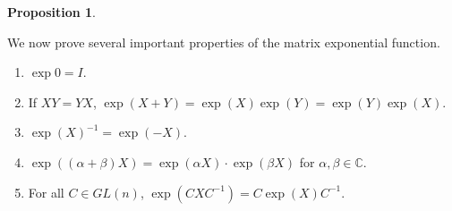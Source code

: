 \documentclass[12pt]{article}
\newcommand{\C}{\mathbb{C}}
\theoremstyle{definition}
\newtheorem{prop}[them]{Proposition}
\theoremstyle{definition}
\theoremstyle{definition}
\theoremstyle{definition}
\theoremstyle{definition}
\theoremstyle{definition}
\theoremstyle{definition}
\theoremstyle{definition}
\begin{document}
\begin{prop}\label{prop:expprop}
\par{We now prove several important properties of the
matrix exponential function.}

\begin{enumerate}
    \item $\exp 0 = I$.
    \item If $XY = YX$, $\exp(X + Y) = \exp(X)\exp(Y) = \exp(Y)\exp(X)$.
    \item ${\exp(X)}^{-1} = {\exp(-X)}$.
    \item $\exp((\alpha +\beta)X) = \exp(\alpha X)
    \cdot \exp(\beta X)$ for $\alpha, \beta \in
    \C$. 
    \item For all $ C \in GL(n)$, $\exp(CXC^{-1}) = C\exp(X)C^{-1}$.
\end{enumerate}
\end{prop}
\end{document}
